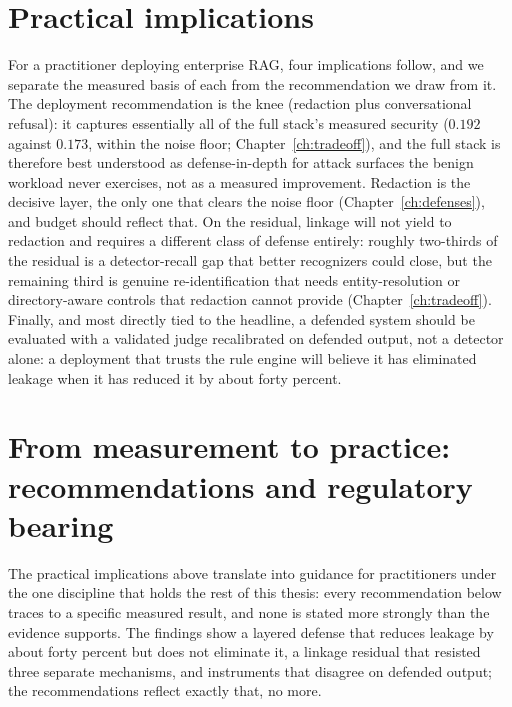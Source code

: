\documentclass[11pt,a4paper]{report}
\begin{document}
\section{Practical implications}
\label{sec:disc-practical}

For a practitioner deploying enterprise RAG, four implications follow, and we separate the
measured basis of each from the recommendation we draw from it. The deployment recommendation is
the knee (redaction plus conversational refusal): it captures essentially all of the full
stack's measured security ($0.192$ against $0.173$, within the noise floor;
Chapter~\ref{ch:tradeoff}), and the full stack is therefore best understood as
defense-in-depth for attack surfaces the benign workload never exercises, not as a measured
improvement. Redaction is the decisive layer, the only one that clears the noise
floor (Chapter~\ref{ch:defenses}), and budget should reflect that. On the residual, linkage
will not yield to redaction and requires a different class of defense entirely:
roughly two-thirds of the residual is a detector-recall gap that better recognizers could close,
but the remaining third is genuine re-identification that needs entity-resolution or
directory-aware controls that redaction cannot provide (Chapter~\ref{ch:tradeoff}). Finally, and
most directly tied to the headline, a defended system should be evaluated with a
validated judge recalibrated on defended output, not a detector alone: a deployment that trusts
the rule engine will believe it has eliminated leakage when it has reduced it by about forty
percent.

\section{From measurement to practice: recommendations and regulatory bearing}
\label{sec:disc-recommendations}

The practical implications above translate into guidance for practitioners under the one discipline that
holds the rest of this thesis: every recommendation below traces to a specific measured result, and none
is stated more strongly than the evidence supports. The findings show a layered defense that reduces
leakage by about forty percent but does not eliminate it, a linkage residual that resisted three separate
mechanisms, and instruments that disagree on defended output; the recommendations reflect exactly
that, no more.
\end{document}
